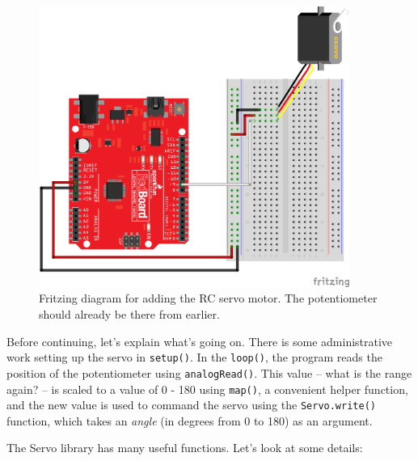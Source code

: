 \documentclass[11pt]{article} %
\begin{document}
\begin{figure}[htbp]
\begin{center}
\includegraphics[width=4in]{figures/servo_fritz.png}
\caption{Fritzing diagram for adding the RC servo motor.  The potentiometer should already be there from earlier.}
\label{fig:servo}
\end{center}
\end{figure}

Before continuing, let’s explain what’s going on. There is some administrative work setting up the servo in \verb|setup()|. In the \verb|loop()|, the program reads the position of the potentiometer using \verb|analogRead()|. This value -- what is the range again? -- is scaled to a value of 0 - 180 using \verb|map()|, a convenient helper function, and the new value is used to command the servo using the \verb|Servo.write()| function, which takes an \emph{angle} (in degrees from 0 to 180) as an argument.


The Servo library has many useful functions. Let’s look at some details:
\end{document}
